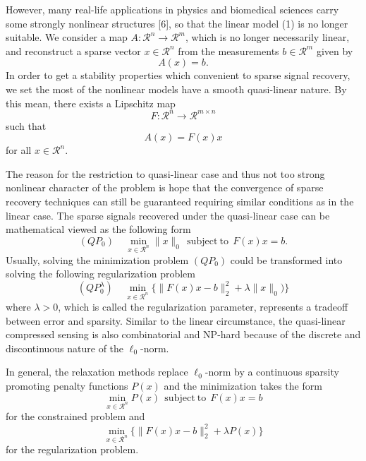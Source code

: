 \documentclass[smallextended]{svjour3}
\begin{document}
However, many real-life applications in physics and biomedical sciences carry some strongly nonlinear structures [6], so
that the linear model (1) is no longer suitable. We consider a map $A: \mathcal{R}^{n}\rightarrow \mathcal{R}^{m}$,
which is no longer necessarily linear, and reconstruct a sparse vector $x\in \mathcal{R}^{n}$ from the
measurements $b\in \mathcal{R}^{m}$ given by
\begin{equation}\label{r2}
A(x)=b.
\end{equation}
In order to get a stability properties which convenient to sparse signal recovery, we set the most of the
nonlinear models have a smooth quasi-linear nature. By this mean, there exists a Lipschitz map
\begin{equation}\label{r3}
F: \mathcal{R}^{n}\rightarrow \mathcal{R}^{m\times n}
\end{equation}
such that
\begin{equation}\label{r4}
A(x)=F(x)x
\end{equation}
for all $x\in \mathcal{R}^{n}$.

The reason for the restriction to quasi-linear case and thus not too strong nonlinear character of the problem is hope that the
convergence of sparse recovery techniques can still be guaranteed requiring similar conditions as in the linear case.
The sparse signals recovered under the quasi-linear case can be mathematical viewed as the following form
\begin{equation}\label{r5}
(QP_{0})\ \ \ \ \ \min_{x\in \mathcal{R}^{n}}\|x\|_{0}\ \ \mathrm{subject}\ \mathrm{to}\ \ F(x)x=b.
\end{equation}
Usually, solving the minimization problem $(QP_{0})$ could be transformed into solving the following regularization problem
\begin{equation}\label{r6}
(QP_{0}^{\lambda})\ \ \ \ \ \min_{x\in \mathcal{R}^{n}} \Big\{\|F(x)x-b\|_{2}^{2}+\lambda\|x\|_{0})\Big\}
\end{equation}
where $\lambda>0$, which is called the regularization parameter, represents a tradeoff between error and sparsity.
Similar to the linear circumstance, the quasi-linear compressed sensing is also combinatorial and NP-hard because of the
discrete and discontinuous nature of the $\ell_{0}$-norm.

In general, the relaxation methods replace $\ell_{0}$-norm by a continuous sparsity promoting penalty functions $P(x)$ and the minimization
takes the form
\begin{equation}\label{r7}
\min_{x\in \mathcal{R}^{n}}P(x)\ \ \mathrm{subject}\ \mathrm{to}\ \ F(x)x=b
\end{equation}
for the constrained problem and
\begin{equation}\label{r8}
\min_{x\in \mathcal{R}^{n}} \Big\{\|F(x)x-b\|_{2}^{2}+\lambda P(x)\Big\}
\end{equation}
for the regularization problem.
\end{document}
